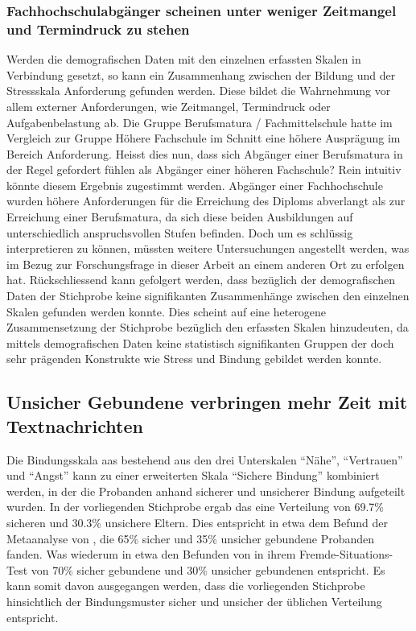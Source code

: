\subsubsection{Fachhochschulabgänger scheinen unter weniger Zeitmangel und Termindruck zu stehen}
Werden die demografischen Daten mit den einzelnen erfassten Skalen in Verbindung gesetzt, so kann ein Zusammenhang zwischen der Bildung und der Stressskala Anforderung gefunden werden. Diese bildet die Wahrnehmung vor allem externer Anforderungen, wie Zeitmangel, Termindruck oder Aufgabenbelastung ab. Die Gruppe Berufsmatura / Fachmittelschule hatte im Vergleich zur Gruppe Höhere Fachschule im Schnitt eine höhere Ausprägung im Bereich Anforderung. Heisst dies nun, dass sich Abgänger einer Berufsmatura in der Regel gefordert fühlen als Abgänger einer höheren Fachschule? Rein intuitiv könnte diesem Ergebnis zugestimmt werden. Abgänger einer Fachhochschule wurden  höhere Anforderungen für die Erreichung des Diploms abverlangt als zur Erreichung einer Berufsmatura, da sich diese beiden Ausbildungen auf unterschiedlich anspruchsvollen Stufen befinden. Doch um es schlüssig interpretieren zu können, müssten weitere Untersuchungen angestellt werden, was im Bezug zur Forschungsfrage in dieser Arbeit an einem anderen Ort zu erfolgen hat. Rückschliessend kann gefolgert werden, dass bezüglich der demografischen Daten der Stichprobe keine signifikanten Zusammenhänge zwischen den einzelnen Skalen gefunden werden konnte. Dies scheint auf eine heterogene Zusammensetzung der Stichprobe bezüglich den erfassten Skalen hinzudeuten, da mittels demografischen Daten keine statistisch signifikanten Gruppen der doch sehr prägenden Konstrukte wie Stress und Bindung gebildet werden konnte. 

\subsection{Unsicher Gebundene verbringen mehr Zeit mit Textnachrichten}
Die Bindungsskala \acrfull{aas} bestehend aus den drei Unterskalen \enquote{Nähe}, \enquote{Vertrauen} und \enquote{Angst} kann zu einer erweiterten Skala \enquote{Sichere Bindung} kombiniert werden, in der die Probanden anhand sicherer und unsicherer Bindung aufgeteilt wurden. In der vorliegenden Stichprobe ergab das eine Verteilung von 
69.7\% sicheren und 30.3\% unsichere Eltern. Dies entspricht in etwa dem Befund der Metaanalyse von , die 65\% sicher und 35\% unsicher gebundene Probanden fanden. Was wiederum in etwa den Befunden von  in ihrem Fremde-Situations-Test von 70\% sicher gebundene und 30\% unsicher gebundenen entspricht. Es kann somit davon ausgegangen werden, dass die vorliegenden Stichprobe hinsichtlich der Bindungsmuster sicher und unsicher der üblichen Verteilung entspricht.

